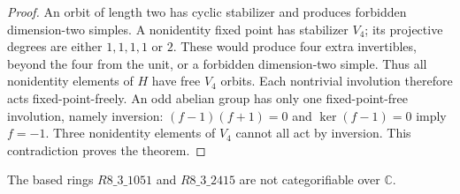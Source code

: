 \begin{proof}
An orbit of length two has cyclic stabilizer and produces forbidden
dimension-two simples. A nonidentity fixed point has stabilizer $V_4$;
its projective degrees are either $1,1,1,1$ or $2$. These would produce
four extra invertibles, beyond the four from the unit, or a forbidden
dimension-two simple. Thus all nonidentity elements of $H$ have free
$V_4$ orbits. Each nontrivial involution therefore acts fixed-point-freely.
An odd abelian group has only one fixed-point-free involution, namely
inversion: $(f-1)(f+1)=0$ and $\ker(f-1)=0$ imply $f=-1$.
Three nonidentity elements of $V_4$ cannot all act by inversion.
This contradiction proves the theorem.
\end{proof}

\begin{theorem}\label{thm:m3-dimension280}
The based rings $R8\_3\_1051$ and $R8\_3\_2415$ are not categorifiable
over $\mathbb C$.
\end{theorem}
